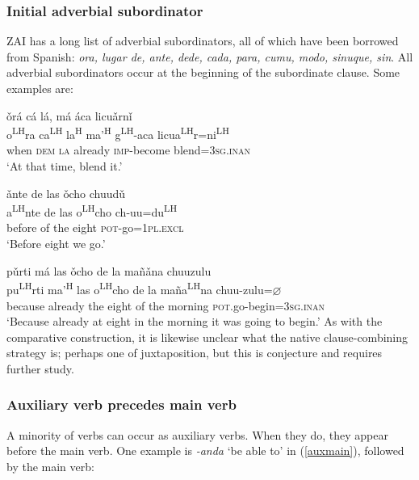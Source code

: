 \subsubsection{Initial adverbial subordinator}

ZAI has a long list of adverbial subordinators, all of which have been borrowed from Spanish: \textit{ora, lugar de, ante, dede, cada, para, cumu, modo, sinuque, sin}. All adverbial subordinators occur at the beginning of the subordinate clause. Some examples are:

\ea\label{ora}
\glll \v{o}r\'{a} c\'{a} l\'{a}, m\'{a} \'{a}ca licu\v{a}rn\v{i}  \\
o\textsuperscript{LH}ra ca\textsuperscript{LH} la\textsuperscript{H} ma'\textsuperscript{H} g\textsuperscript{LH}-aca licua\textsuperscript{LH}r=ni\textsuperscript{LH} \\
when \textsc{dem} \textsc{la} already \textsc{imp}-become blend=\textsc{3sg.inan} \\
\glt `At that time, blend it.'
\z

\ea\label{ante}
\glll \v{a}nte de las \v{o}cho chuud\v{u}  \\
a\textsuperscript{LH}nte de las o\textsuperscript{LH}cho ch-uu=du\textsuperscript{LH} \\
before of the eight \textsc{pot}-go=\textsc{1pl.excl} \\
\glt `Before eight we go.'
\z

\ea\label{purti}
\glll p\v{u}rti m\'{a} las \v{o}cho de la mañ\v{a}na chuuzulu \\
pu\textsuperscript{LH}rti ma'\textsuperscript{H} las o\textsuperscript{LH}cho de la maña\textsuperscript{LH}na chuu-zulu=$\varnothing$ \\
because already the eight of the morning \textsc{pot}.go-begin=\textsc{3sg.inan} \\
\glt `Because already at eight in the morning it was going to begin.'
\z
As with the comparative construction, it is likewise unclear what the native clause-combining strategy is; perhaps one of juxtaposition, but this is conjecture and requires further study.





\subsubsection{Auxiliary verb precedes main verb}
	
A minority of verbs can occur as auxiliary verbs. When they do, they appear before the main verb. One example is \textit{-anda} `be able to' in (\ref{auxmain}), followed by the main verb:

